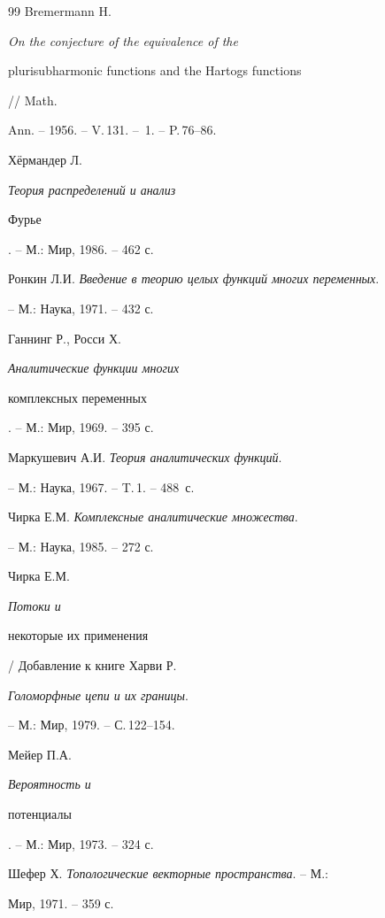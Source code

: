 \begin{thebibliography}{99}
Bremermann H. {\em On the conjecture of the equivalence of the 


plurisubharmonic functions and the Hartogs functions} // Math. 


Ann. -- 1956. -- V.\,131. -- \No\,1. -- P.\,76--86. 




Х\"ермандер Л. {\em Теория распределений и анализ 


Фурье}. -- М.: Мир, 1986. -- 462 с. 




Ронкин Л.И. {\em Введение в теорию целых функций многих переменных}.


-- М.: Наука, 1971. -- 432 с. 




Ганнинг Р., Росси Х. {\em Аналитические функции многих 


комплексных переменных}. -- М.: Мир, 1969. -- 395 с. 




Маркушевич А.И. {\em Теория аналитических функций}.


-- М.: Наука, 1967. -- T.\,1. -- 488~с. 




Чирка Е.М. {\em Комплексные аналитические множества}. 


-- М.: Наука, 1985. -- 272 с. 




Чирка Е.М. {\em Потоки и 


некоторые их применения} / Добавление к книге Харви Р.


{\em Голоморфные цепи и их границы}. 


-- М.: Мир, 1979. -- С.\,122--154. 




Мейер П.А. {\em Вероятность и 


потенциалы}. -- М.: Мир, 1973. -- 324 с. 




Шефер Х. {\em Топологические векторные пространства}. -- М.: 


Мир, 1971. -- 359 с.





\end{thebibliography}





\vskip 2cm












\label{end}





